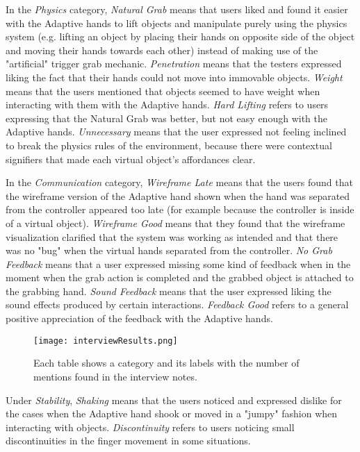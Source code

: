 In the \textit{Physics} category, \textit{Natural Grab} means that users liked and found it easier with the Adaptive hands to lift objects and manipulate purely using the physics system (e.g. lifting an object by placing their hands on opposite side of the object and moving their hands towards each other) instead of making use of the "artificial" trigger grab mechanic. \textit{Penetration} means that the testers expressed liking the fact that their hands could not move into immovable objects. \textit{Weight} means that the users mentioned that objects seemed to have weight when interacting with them with the Adaptive hands. \textit{Hard Lifting} refers to users expressing that the Natural Grab was better, but not easy enough with the Adaptive hands. \textit{Unnecessary} means that the user expressed not feeling inclined to break the physics rules of the environment, because there were contextual signifiers \parencite{Norman2010} that made each virtual object's affordances clear.

In the \textit{Communication} category, \textit{Wireframe Late} means that the users found that the wireframe version of the Adaptive hand shown when the hand was separated from the controller appeared too late (for example because the controller is inside of a virtual object). \textit{Wireframe Good} means that they found that the wireframe visualization clarified that the system was working as intended and that there was no "bug" when the virtual hands separated from the controller. \textit{No Grab Feedback} means that a user expressed missing some kind of feedback when in the moment when the grab action is completed and the grabbed object is attached to the grabbing hand. \textit{Sound Feedback} means that the user expressed liking the sound effects produced by certain interactions. \textit{Feedback Good} refers to a general positive appreciation of the feedback with the Adaptive hands.

\begin{figure}[H]
\centering
\texttt{[image: interviewResults.png]}
\caption{Each table shows a category and its labels with the number of mentions found in the interview notes.}
\label{fig:interviewResults}
\end{figure}

Under \textit{Stability}, \textit{Shaking} means that the users noticed and expressed dislike for the cases when the Adaptive hand shook or moved in a "jumpy" fashion when interacting with objects. \textit{Discontinuity} refers to users noticing small discontinuities in the finger movement in some situations.

